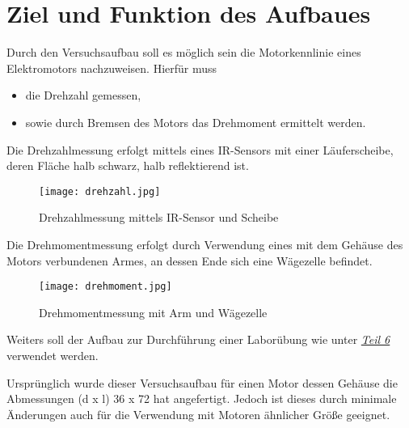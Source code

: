 \chapter{Ziel und Funktion des Aufbaues}

Durch den Versuchsaufbau soll es möglich sein die Motorkennlinie eines Elektromotors nachzuweisen.
Hierfür muss

\begin{itemize}
    \item die Drehzahl gemessen,
    \item sowie durch Bremsen des Motors das Drehmoment ermittelt werden.
\end{itemize}

Die Drehzahlmessung erfolgt mittels eines IR-Sensors mit einer Läuferscheibe, deren Fläche halb schwarz, halb reflektierend ist.

\begin{figure}[H]
    \begin{center}
        \texttt{[image: drehzahl.jpg]}
        \caption{Drehzahlmessung mittels IR-Sensor und Scheibe}
    \end{center}
\end{figure}

Die Drehmomentmessung erfolgt durch Verwendung eines mit dem Gehäuse des Motors verbundenen Armes, an dessen Ende sich eine Wägezelle befindet.

\begin{figure}[H]
    \begin{center}
        \texttt{[image: drehmoment.jpg]}
        \caption{Drehmomentmessung mit Arm und Wägezelle}
    \end{center}
\end{figure}

Weiters soll der Aufbau zur Durchführung einer Laborübung wie unter \hyperref[labuebung]{\textit{Teil 6}} verwendet werden.

Ursprünglich wurde dieser Versuchsaufbau für einen Motor dessen Gehäuse die Abmessungen (d x l) 36 x 72 hat angefertigt.
Jedoch ist dieses durch minimale Änderungen auch für die Verwendung mit Motoren ähnlicher Größe geeignet.
